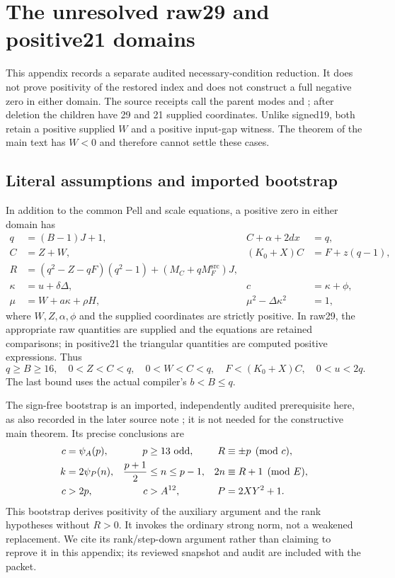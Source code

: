 \documentclass[11pt,letterpaper]{article}
\theoremstyle{definition}\newtheorem{definition}[theorem]{Definition}
\theoremstyle{remark}\newtheorem{remark}[theorem]{Remark}
\newcommand{\code}[1]{\texttt{\detokenize{#1}}}
\newcommand{\MFsrc}{M_F^{\mathrm{src}}}
\newcommand{\MC}{M_C}
\begin{document}
\section{The unresolved raw29 and positive21 domains}\label{fup:ir:app:raw}
This appendix records a separate audited necessary-condition reduction. It does not prove positivity of the restored index and does not construct a full negative zero in either domain. The source receipts call the parent modes \code{raw30} and \code{positive22}; after deletion the children have 29 and 21 supplied coordinates. Unlike signed19, both retain a positive supplied $W$ and a positive input-gap witness. The theorem of the main text has $W<0$ and therefore cannot settle these cases.

\subsection{Literal assumptions and imported bootstrap}
In addition to the common Pell and scale equations, a positive zero in either domain has
\begin{align*}
 q&=(B-1)J+1,& C+\alpha+2dx&=q,\\
 C&=Z+W,&(K_0+X)C&=F+z(q-1),\\
 R&=(q^2-Z-qF)(q^2-1)+(\MC+q\MFsrc)J,\\
 \kappa&=u+\delta\Delta,&c&=\kappa+\phi,\\
 \mu&=W+a\kappa+\rho H,&\mu^2-\Delta\kappa^2&=1,
\end{align*}
where $W,Z,\alpha,\phi$ and the supplied coordinates are strictly positive. In raw29, the appropriate raw quantities are supplied and the equations are retained comparisons; in positive21 the triangular quantities are computed positive expressions. Thus
\begin{equation}\label{fup:ir:eq:rawouter}
 q\ge B\ge16,\quad0<Z<C<q,\quad0<W<C<q,\quad
 F<(K_0+X)C,\quad0<u<2q.
\end{equation}
The last bound uses the actual compiler's $b<B\le q$.

The sign-free bootstrap is an imported, independently audited prerequisite here, as also recorded in the later source note \cite{fup:ir:newbootstrap}; it is not needed for the constructive main theorem. Its precise conclusions are
\begin{align}
 c&=\psi_A(p),& p&\ge13\text{ odd},& R&\equiv\pm p\pmod c,\label{fup:ir:eq:bootstrapraw}\\
 k&=2\psi_P(n),&\frac{p+1}{2}&\le n\le p-1,&2n&\equiv R+1\pmod E,\notag\\
 c&>2p,&c&>A^{12},&P&=2XY^2+1.\notag
\end{align}
This bootstrap derives positivity of the auxiliary argument and the rank hypotheses without $R>0$. It invokes the ordinary strong norm, not a weakened replacement. We cite its rank/step-down argument rather than claiming to reprove it in this appendix; its reviewed snapshot and audit are included with the packet.
\end{document}
